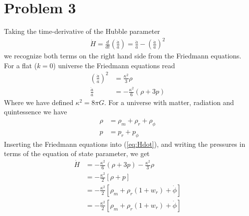 \documentclass[reprint,english,notitlepage]{revtex4-1}  %
\begin{document}
\section{Problem 3}
Taking the time-derivative of the Hubble parameter
\begin{align}
	\dot{H} = \frac{d}{dt}\left(\frac{\dot{a}}{a}\right) = \frac{\ddot{a}}{a} - \left(\frac{\dot{a}}{a}\right)^2 \label{eq:Hdot}
\end{align}
we recognize both terms on the right hand side from the Friedmann equations. For a flat ($k=0$) universe the Friedmann equations read
\begin{align}
	\left(\frac{\dot{a}}{a}\right)^2 &= \frac{\kappa^2}{3}\rho \\
	\frac{\ddot{a}}{a}		&= -\frac{\kappa^2}{6}\left(\rho + 3p \right)
\end{align}
Where we have defined $\kappa^2 = 8\pi G$. For a universe with matter, radiation
and quintessence we have
\begin{align}
	\rho &= \rho_m + \rho_r + \rho_\phi \\
	p    &= p_r + p_\phi
\end{align}
Inserting the Friedmann equations into (\ref{eq:Hdot}), and writing the pressures in terms of the equation of state parameter, we get
\begin{align}
	\dot{H} &= -\frac{\kappa^2}{6}\left(\rho + 3p \right) - \frac{\kappa^2}{3}\rho \\
					&= -\frac{\kappa^2}{2} \left[\rho + p \right] \\
					&= -\frac{\kappa^2}{2} \left[ \rho_m + \rho_r(1+w_r) + \dot{\phi}\right]\\
					&= -\frac{\kappa^2}{2} \left[ \rho_m + \rho_r(1+w_r) + \dot{\phi}\right]
					\label{eq:Hdot}
\end{align}
\end{document}
